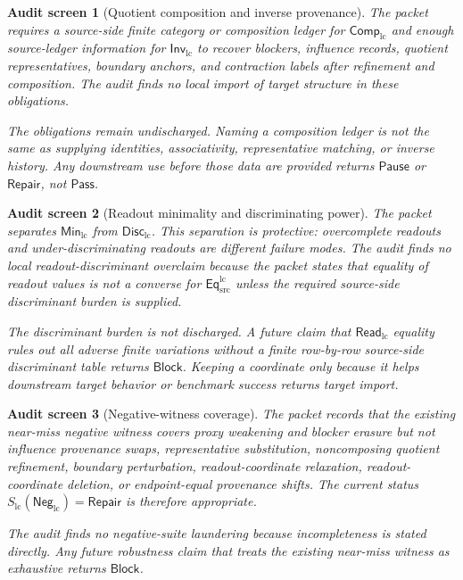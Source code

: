 \documentclass[11pt]{article}
\newcommand{\EqLC}{\mathsf{Eq}_{\mathrm{src}}^{\mathrm{lc}}}
\newcommand{\ReadLC}{\mathsf{Read}_{\mathrm{lc}}}
\newcommand{\CompLC}{\mathsf{Comp}_{\mathrm{lc}}}
\newcommand{\InvLC}{\mathsf{Inv}_{\mathrm{lc}}}
\newcommand{\MinLC}{\mathsf{Min}_{\mathrm{lc}}}
\newcommand{\DiscLC}{\mathsf{Disc}_{\mathrm{lc}}}
\newcommand{\NegLC}{\mathsf{Neg}_{\mathrm{lc}}}
\newcommand{\Pass}{\mathsf{Pass}}
\newcommand{\Block}{\mathsf{Block}}
\newcommand{\Pause}{\mathsf{Pause}}
\newcommand{\Repair}{\mathsf{Repair}}
\newtheorem{screen}{Audit screen}
\begin{document}
\begin{screen}[Quotient composition and inverse provenance]
The packet requires a source-side finite category or composition ledger
for \(\CompLC\) and enough source-ledger information for \(\InvLC\) to
recover blockers, influence records, quotient representatives,
boundary anchors, and contraction labels after refinement and
composition. The audit finds no local import of target structure in
these obligations.

The obligations remain undischarged. Naming a composition ledger is not
the same as supplying identities, associativity, representative
matching, or inverse history. Any downstream use before those data are
provided returns \(\Pause\) or \(\Repair\), not \(\Pass\).
\end{screen}

\begin{screen}[Readout minimality and discriminating power]
The packet separates \(\MinLC\) from \(\DiscLC\). This separation is
protective: overcomplete readouts and under-discriminating readouts are
different failure modes. The audit finds no local readout-discriminant
overclaim because the packet states that equality of readout values is
not a converse for \(\EqLC\) unless the required source-side
discriminant burden is supplied.

The discriminant burden is not discharged. A future claim that
\(\ReadLC\) equality rules out all adverse finite variations without a
finite row-by-row source-side discriminant table returns \(\Block\).
Keeping a coordinate only because it helps downstream target behavior
or benchmark success returns target import.
\end{screen}

\begin{screen}[Negative-witness coverage]
The packet records that the existing near-miss negative witness covers
proxy weakening and blocker erasure but not influence provenance swaps,
representative substitution, noncomposing quotient refinement, boundary
perturbation, readout-coordinate relaxation, readout-coordinate
deletion, or endpoint-equal provenance shifts. The current status
\(S_{\mathrm{lc}}(\NegLC)=\Repair\) is therefore appropriate.

The audit finds no negative-suite laundering because incompleteness is
stated directly. Any future robustness claim that treats the existing
near-miss witness as exhaustive returns \(\Block\).
\end{screen}
\end{document}
